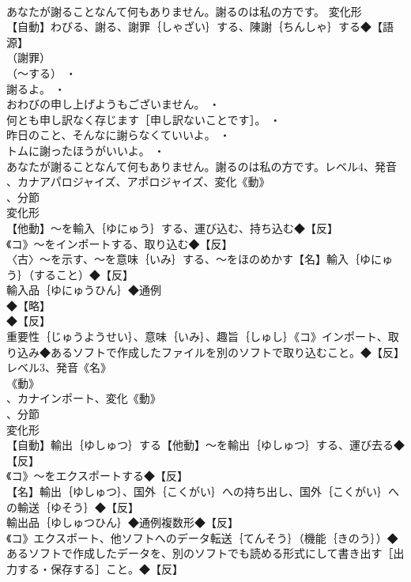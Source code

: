 \documentclass[8pt]{extreport}
\begin{document}
\begin{CJK}{UTF8}{min}
\\	あなたが謝ることなんて何もありません。謝るのは私の方です。	変化形 
\\	【自動】わびる、謝る、謝罪｛しゃざい｝する、陳謝｛ちんしゃ｝する◆【語源】
\\	（謝罪）
\\	（～する） ・
\\	謝るよ。 ・
\\	おわびの申し上げようもございません。 ・
\\	何とも申し訳なく存じます［申し訳ないことです］。 ・
\\	昨日のこと、そんなに謝らなくていいよ。 ・
\\	トムに謝ったほうがいいよ。 ・
\\	あなたが謝ることなんて何もありません。謝るのは私の方です。レベル4、発音
\\	、カナアパロジャイズ、アポロジャイズ、変化《動》
\\	、分節
\\	変化形 
\\	【他動】～を輸入｛ゆにゅう｝する、運び込む、持ち込む◆【反】
\\	《コ》～をインポートする、取り込む◆【反】
\\	〈古〉～を示す、～を意味｛いみ｝する、～をほのめかす【名】輸入｛ゆにゅう｝（すること）◆【反】
\\	輸入品｛ゆにゅうひん｝◆通例
\\	◆【略】
\\	◆【反】
\\	重要性｛じゅうようせい｝、意味｛いみ｝、趣旨｛しゅし｝《コ》インポート、取り込み◆あるソフトで作成したファイルを別のソフトで取り込むこと。◆【反】
\\	レベル3、発音《名》
\\	《動》
\\	、カナインポート、変化《動》
\\	、分節
\\	変化形 
\\	【自動】輸出｛ゆしゅつ｝する【他動】～を輸出｛ゆしゅつ｝する、運び去る◆【反】
\\	《コ》～をエクスポートする◆【反】
\\	【名】輸出｛ゆしゅつ｝、国外｛こくがい｝への持ち出し、国外｛こくがい｝への輸送｛ゆそう｝◆【反】
\\	輸出品｛ゆしゅつひん｝◆通例複数形◆【反】
\\	《コ》エクスポート、他ソフトへのデータ転送｛てんそう｝（機能｛きのう｝）◆あるソフトで作成したデータを、別のソフトでも読める形式にして書き出す［出力する・保存する］こと。◆【反】

\end{CJK}
\end{document}
